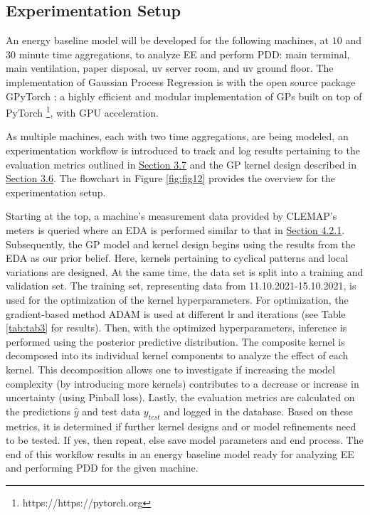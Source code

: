 \subsection{Experimentation Setup}

An energy baseline model will be developed for the following machines, at $10$ and $30$ minute time aggregations, to analyze EE and perform PDD: main terminal, main ventilation, paper disposal, uv server room, and uv ground floor. The implementation of Gaussian Process Regression is with the open source package GPyTorch \cite{gardner2018gpytorch}; a highly efficient and modular implementation of GPs built on top of PyTorch \footnote[2]{https://https://pytorch.org}, with \ac{GPU} acceleration. 

As multiple machines, each with two time aggregations, are being modeled, an experimentation workflow is introduced to track and log results pertaining to the evaluation metrics outlined in \hyperlink{subsection.3.7}{Section 3.7} and the GP kernel design described in \hyperlink{subsection.3.6}{Section 3.6}. The flowchart in Figure \ref{fig:fig12} provides the overview for the experimentation setup. 

Starting at the top, a machine's measurement data provided by CLEMAP's meters is queried where an EDA is performed similar to that in \hyperlink{subsubsection.4.2.1}{Section 4.2.1}. Subsequently, the GP model and kernel design begins using the results from the EDA as our prior belief. Here, kernels pertaining to cyclical patterns and local variations are designed. At the same time, the data set is split into a training and validation set. The training set, representing data from 11.10.2021-15.10.2021, is used for the optimization of the kernel hyperparameters. For optimization, the gradient-based method \ac{ADAM} \cite{pml1Book} is used at different \ac{lr} and iterations (see Table \ref{tab:tab3} for results). Then, with the optimized hyperparameters, inference is performed using the posterior predictive distribution. The composite kernel is decomposed into its individual kernel components to analyze the effect of each kernel. This decomposition allows one to investigate if increasing the model complexity (by introducing more kernels) contributes to a decrease or increase in uncertainty (using Pinball loss). Lastly, the evaluation metrics are calculated on the predictions $\hat{y}$ and test data $y_{test}$ and logged in the database. Based on these metrics, it is determined if further kernel designs and or model refinements need to be tested. If yes, then repeat, else save model parameters and end process. The end of this workflow results in an energy baseline model ready for analyzing EE and performing PDD for the given machine.   

